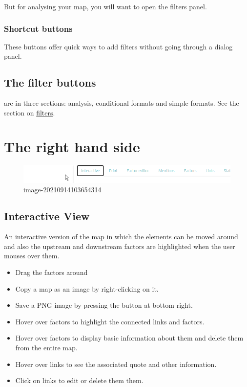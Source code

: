 \documentclass[
]{book}
\providecommand{\tightlist}{%
  \setlength{\itemsep}{0pt}\setlength{\parskip}{0pt}}
\begin{document}
But for analysing your map, you will want to open the filters panel.

\hypertarget{shortcut-buttons}{%
\subsubsection{Shortcut buttons}\label{shortcut-buttons}}

These buttons offer quick ways to add filters without going through a dialog panel.

\hypertarget{the-filter-buttons}{%
\subsection{The filter buttons}\label{the-filter-buttons}}

are in three sections: analysis, conditional formats and simple formats. See the section on \href{xx}{filters}.

\hypertarget{the-right-hand-side}{%
\section{The right hand side}\label{the-right-hand-side}}

\begin{figure}
\centering
\includegraphics{_assets/image-20210914103654314.png}
\caption{image-20210914103654314}
\end{figure}

\hypertarget{interactive-view}{%
\subsection{Interactive View}\label{interactive-view}}

An interactive version of the map in which the elements can be moved around and also the upstream and downstream factors are highlighted when the user mouses over them.

\begin{itemize}
\tightlist
\item
  Drag the factors around
\item
  Copy a map as an image by right-clicking on it.
\item
  Save a PNG image by pressing the button at bottom right.
\item
  Hover over factors to highlight the connected links and factors.
\item
  Hover over factors to display basic information about them and delete them from the entire map.
\item
  Hover over links to see the associated quote and other information.
\item
  Click on links to edit or delete them them.
\end{itemize}
\end{document}
